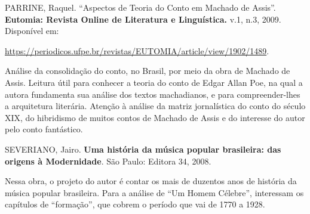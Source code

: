 \documentclass[12pt]{extarticle}
\begin{document}
PARRINE, Raquel. ``Aspectos de Teoria do Conto em Machado de Assis''.
\textbf{Eutomia: Revista Online de Literatura e Linguística.} v.1, n.3,
2009. Disponível em:

\url{https://periodicos.ufpe.br/revistas/EUTOMIA/article/view/1902/1489}.

Análise da consolidação do conto, no Brasil, por meio da obra de Machado
de Assis. Leitura útil para conhecer a teoria do conto de Edgar Allan
Poe, na qual a autora fundamenta sua análise dos textos machadianos, e
para compreender-lhes a arquitetura literária. Atenção à análise da
matriz jornalística do conto do século XIX, do hibridismo de muitos
contos de Machado de Assis e do interesse do autor pelo conto
fantástico.

SEVERIANO, Jairo. \textbf{Uma história da música popular brasileira: das
origens à Modernidade}. São Paulo: Editora 34, 2008.

Nessa obra, o projeto do autor é contar os mais de duzentos anos de
história da música popular brasileira. Para a análise de ``Um Homem
Célebre'', interessam os capítulos de ``formação'', que cobrem o período
que vai de 1770 a 1928.
\end{document}

